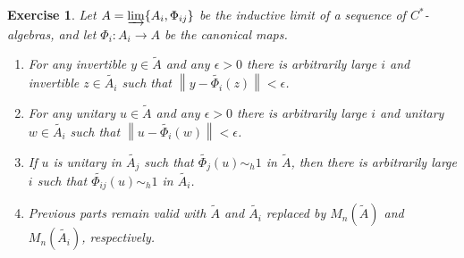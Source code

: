 \documentclass{book}
\newtheorem{exercise}{Exercise}[section]
\def\cstars{\(C^*\)-algebras}
\begin{document}
\begin{exercise}\label{ex:7310}
  Let \(A=\varinjlim\{A_i,\Phi_{ij}\}\) be the inductive limit of a sequence of \cstars,
  and let \(\Phi_i:A_i\rightarrow A\) be the canonical maps.
  \begin{enumerate}
    \item For any invertible \(y\in\tilde{A}\) and any \(\epsilon>0\) there is arbitrarily large \(i\) and invertible \(z\in \tilde{A_i}\)
      such that \(\left\|y-\widetilde{\Phi_i}(z)\right\|<\epsilon\).\label{ex:73101}
    \item For any unitary \(u\in\tilde{A}\) and any \(\epsilon>0\) there is arbitrarily large \(i\) and unitary \(w\in\tilde{A_i}\) such that \(\left\|u-\widetilde{\Phi_{i}}(w)\right\|<\epsilon\).\label{ex:73102}
    \item If \(u\) is unitary in \(\tilde{A_j}\) such that \(\widetilde{\Phi_j}(u)\sim_h 1\) in \(\tilde{A}\), then there is arbitrarily large \(i\) such that \(\widetilde{\Phi_{ij}}(u)\sim_h 1\) in \(\tilde{A_i}\).\label{ex:73103}
    \item Previous parts remain valid with \(\tilde{A}\) and \(\tilde{A_i}\) replaced by \(M_n(\tilde{A})\) and \(M_n(\tilde{A_i})\), respectively.\label{ex:73104}
  \end{enumerate}
\end{exercise}
\end{document}

